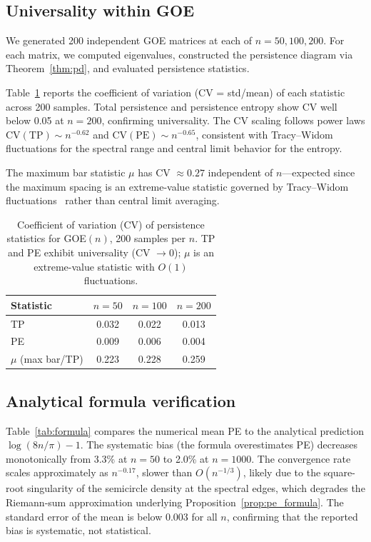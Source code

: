 \documentclass[aps,pre,twocolumn,superscriptaddress,showpacs]{revtex4-2}
\begin{document}
\subsection{Universality within GOE}

We generated 200 independent GOE matrices at each of $n = 50, 100, 200$. For each matrix, we computed eigenvalues, constructed the persistence diagram via Theorem~\ref{thm:pd}, and evaluated persistence statistics.

Table~\ref{tab:universality} reports the coefficient of variation (CV = std/mean) of each statistic across 200 samples. Total persistence and persistence entropy show CV well below 0.05 at $n = 200$, confirming universality. The CV scaling follows power laws $\mathrm{CV}(\mathrm{TP}) \sim n^{-0.62}$ and $\mathrm{CV}(\mathrm{PE}) \sim n^{-0.65}$, consistent with Tracy--Widom fluctuations for the spectral range and central limit behavior for the entropy.

The maximum bar statistic $\mu$ has CV $\approx 0.27$ independent of $n$---expected since the maximum spacing is an extreme-value statistic governed by Tracy--Widom fluctuations~\cite{tracy1996} rather than central limit averaging.

\begin{table}[h]
\caption{Coefficient of variation (CV) of persistence statistics for GOE$(n)$, 200 samples per $n$. TP and PE exhibit universality (CV $\to 0$); $\mu$ is an extreme-value statistic with $O(1)$ fluctuations.}
\label{tab:universality}
\begin{ruledtabular}
\begin{tabular}{lccc}
Statistic & $n = 50$ & $n = 100$ & $n = 200$ \\
\midrule
TP & 0.032 & 0.022 & 0.013 \\
PE & 0.009 & 0.006 & 0.004 \\
$\mu$ (max bar/TP) & 0.223 & 0.228 & 0.259 \\
\end{tabular}
\end{ruledtabular}
\end{table}

\subsection{Analytical formula verification}

Table~\ref{tab:formula} compares the numerical mean PE to the analytical prediction $\log(8n/\pi) - 1$. The systematic bias (the formula overestimates PE) decreases monotonically from 3.3\% at $n = 50$ to 2.0\% at $n = 1000$. The convergence rate scales approximately as $n^{-0.17}$, slower than $O(n^{-1/3})$, likely due to the square-root singularity of the semicircle density at the spectral edges, which degrades the Riemann-sum approximation underlying Proposition~\ref{prop:pe_formula}. The standard error of the mean is below 0.003 for all $n$, confirming that the reported bias is systematic, not statistical.
\end{document}

